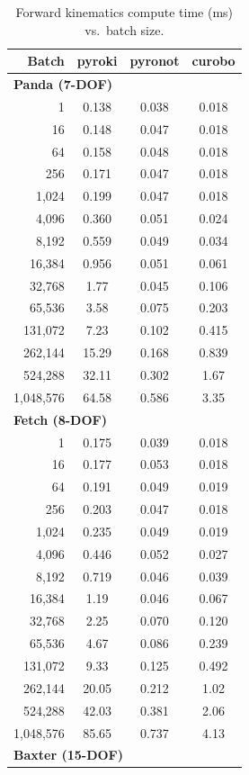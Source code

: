 \begin{table}[t]
\centering
\caption{Forward kinematics compute time (ms) vs.\ batch size.}
\label{tab:fk_benchmark}
\small
\begin{tabular}{rccc}
\toprule
Batch & pyroki & pyronot & curobo \\
\midrule
\multicolumn{4}{l}{\textbf{Panda (7-DOF)}} \\
1 & 0.138 & 0.038 & 0.018 \\
16 & 0.148 & 0.047 & 0.018 \\
64 & 0.158 & 0.048 & 0.018 \\
256 & 0.171 & 0.047 & 0.018 \\
1,024 & 0.199 & 0.047 & 0.018 \\
4,096 & 0.360 & 0.051 & 0.024 \\
8,192 & 0.559 & 0.049 & 0.034 \\
16,384 & 0.956 & 0.051 & 0.061 \\
32,768 & 1.77 & 0.045 & 0.106 \\
65,536 & 3.58 & 0.075 & 0.203 \\
131,072 & 7.23 & 0.102 & 0.415 \\
262,144 & 15.29 & 0.168 & 0.839 \\
524,288 & 32.11 & 0.302 & 1.67 \\
1,048,576 & 64.58 & 0.586 & 3.35 \\
\midrule
\multicolumn{4}{l}{\textbf{Fetch (8-DOF)}} \\
1 & 0.175 & 0.039 & 0.018 \\
16 & 0.177 & 0.053 & 0.018 \\
64 & 0.191 & 0.049 & 0.019 \\
256 & 0.203 & 0.047 & 0.018 \\
1,024 & 0.235 & 0.049 & 0.019 \\
4,096 & 0.446 & 0.052 & 0.027 \\
8,192 & 0.719 & 0.046 & 0.039 \\
16,384 & 1.19 & 0.046 & 0.067 \\
32,768 & 2.25 & 0.070 & 0.120 \\
65,536 & 4.67 & 0.086 & 0.239 \\
131,072 & 9.33 & 0.125 & 0.492 \\
262,144 & 20.05 & 0.212 & 1.02 \\
524,288 & 42.03 & 0.381 & 2.06 \\
1,048,576 & 85.65 & 0.737 & 4.13 \\
\midrule
\multicolumn{4}{l}{\textbf{Baxter (15-DOF)}} \\

\end{tabular}
\end{table}
